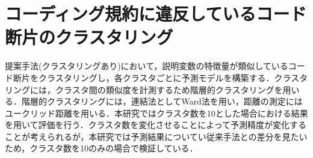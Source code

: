 \documentclass[11pt,dvipdfmx]{jreport}
\begin{document}






\begin{table}[t]
    \centering
    \caption{正例と負例の分類}
    \label{tab:pos_neg}
\end{table}

\section{コーディング規約に違反しているコード断片のクラスタリング}


提案手法(クラスタリングあり)において，説明変数の特徴量が類似しているコード断片をクラスタリングし，各クラスタごとに予測モデルを構築する．クラスタリングには，クラスタ間の類似度を計測するため階層的クラスタリングを用いる．階層的クラスタリングには，連結法としてWard法を用い，距離の測定にはユークリッド距離を用いる\cite{ward}．本研究ではクラスタ数を10とした場合における結果を用いて評価を行う．クラスタ数を変化させることによって予測精度が変化することが考えられるが，本研究では予測結果についてい従来手法との差分を見たいため，クラスタ数を10のみの場合で検証している．
\end{document}
